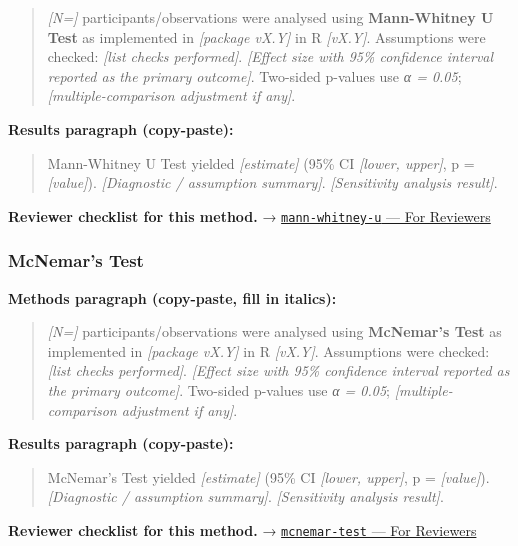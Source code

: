 \documentclass[
]{article}
\begin{document}
\begin{quote}
\emph{{[}N={]}} participants/observations were analysed using
\textbf{Mann-Whitney U Test} as implemented in \emph{{[}package vX.Y{]}}
in R \emph{{[}vX.Y{]}}. Assumptions were checked: \emph{{[}list checks
performed{]}}. \emph{{[}Effect size with 95\% confidence interval
reported as the primary outcome{]}}. Two-sided p-values use \emph{α =
0.05}; \emph{{[}multiple-comparison adjustment if any{]}}.
\end{quote}

\textbf{Results paragraph (copy-paste):}

\begin{quote}
Mann-Whitney U Test yielded \emph{{[}estimate{]}} (95\% CI
\emph{{[}lower, upper{]}}, p = \emph{{[}value{]}}). \emph{{[}Diagnostic
/ assumption summary{]}}. \emph{{[}Sensitivity analysis result{]}}.
\end{quote}

\textbf{Reviewer checklist for this method.} →
\href{../chapters/04-inferential/mann-whitney-u.Rmd\#for-reviewers}{\texttt{mann-whitney-u}
--- For Reviewers}

\subsubsection{McNemar's Test}\label{mcnemars-test}

\textbf{Methods paragraph (copy-paste, fill in italics):}

\begin{quote}
\emph{{[}N={]}} participants/observations were analysed using
\textbf{McNemar's Test} as implemented in \emph{{[}package vX.Y{]}} in R
\emph{{[}vX.Y{]}}. Assumptions were checked: \emph{{[}list checks
performed{]}}. \emph{{[}Effect size with 95\% confidence interval
reported as the primary outcome{]}}. Two-sided p-values use \emph{α =
0.05}; \emph{{[}multiple-comparison adjustment if any{]}}.
\end{quote}

\textbf{Results paragraph (copy-paste):}

\begin{quote}
McNemar's Test yielded \emph{{[}estimate{]}} (95\% CI \emph{{[}lower,
upper{]}}, p = \emph{{[}value{]}}). \emph{{[}Diagnostic / assumption
summary{]}}. \emph{{[}Sensitivity analysis result{]}}.
\end{quote}

\textbf{Reviewer checklist for this method.} →
\href{../chapters/04-inferential/mcnemar-test.Rmd\#for-reviewers}{\texttt{mcnemar-test}
--- For Reviewers}
\end{document}
